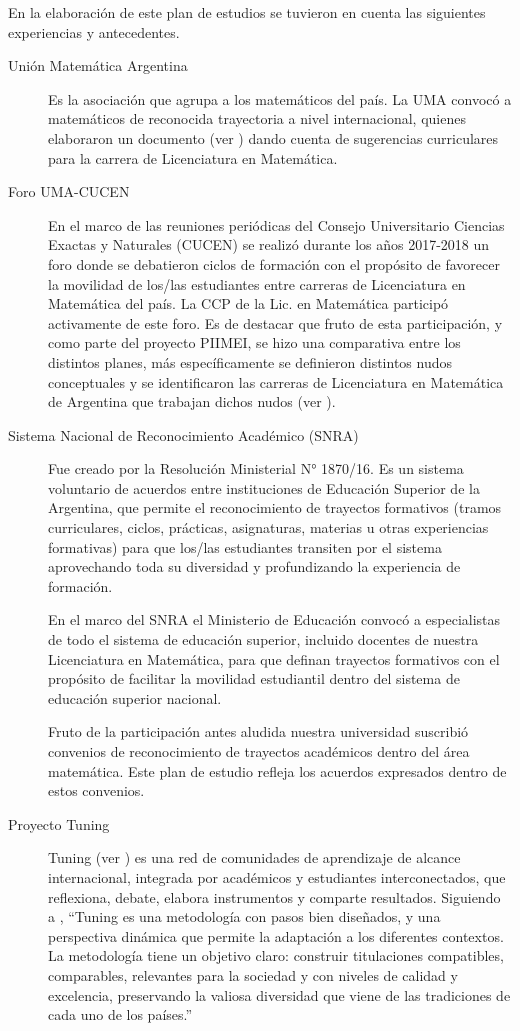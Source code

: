 \documentclass[a4paper, 12pt]{article}
\begin{document}
En la elaboración de este plan de estudios se tuvieron en cuenta las siguientes experiencias y antecedentes.
\begin{description}
 \item[Unión Matemática Argentina]  Es la asociación que agrupa a los matemáticos del país.  La UMA convocó a matemáticos de reconocida trayectoria a nivel internacional, quienes elaboraron un documento (ver \cite{uma}) 
 dando cuenta de sugerencias curriculares para la carrera de Licenciatura en Matemática.
 
 \item[Foro UMA-CUCEN] En el marco de las reuniones periódicas del Consejo Universitario Ciencias Exactas y Naturales (CUCEN) se realizó durante los años 2017-2018 un foro donde se debatieron ciclos de formación con el propósito de favorecer la movilidad de los/las estudiantes entre carreras de Licenciatura en Matemática del país. La CCP de la Lic. en Matemática  participó activamente de este foro. Es de destacar que fruto de esta participación, y como parte del proyecto PIIMEI, se hizo una comparativa entre los distintos planes, más específicamente se definieron distintos nudos conceptuales y se identificaron las carreras de Licenciatura en Matemática de Argentina que trabajan dichos nudos (ver \cite{CCP}). 

\item[Sistema Nacional de Reconocimiento Académico (SNRA)] Fue creado por la Resolución Ministerial N° 1870/16. Es un sistema voluntario de acuerdos entre instituciones de Educación Superior de la Argentina, que permite el reconocimiento de trayectos formativos (tramos curriculares, ciclos, prácticas, asignaturas, materias u otras experiencias formativas) para que los/las estudiantes transiten por el sistema aprovechando toda su diversidad y profundizando la experiencia de formación. 

En el marco del SNRA el Ministerio de Educación convocó a especialistas de todo el sistema de educación superior, incluido docentes de nuestra Licenciatura en Matemática,  para que definan trayectos formativos con el propósito de facilitar la movilidad estudiantil dentro del sistema de educación superior nacional. 

Fruto de la participación antes aludida nuestra universidad suscribió convenios de reconocimiento de trayectos académicos dentro del área matemática. Este plan de estudio refleja los acuerdos expresados dentro de estos convenios.

\item[Proyecto Tuning] Tuning (ver \cite{betoine}) es una red de comunidades de aprendizaje de alcance internacional, integrada por académicos y estudiantes interconectados, que reflexiona, debate, elabora instrumentos
y comparte resultados. Siguiendo a \cite{paniagua2013educacion},
 ``Tuning es una metodología con pasos bien diseñados, y una perspectiva dinámica que permite la adaptación a los diferentes contextos. La metodología tiene un objetivo claro: construir titulaciones compatibles, comparables, relevantes para la sociedad y con niveles
de calidad y excelencia, preservando la valiosa diversidad que viene de las
tradiciones de cada uno de los países.'' 


\end{description}
\end{document}
